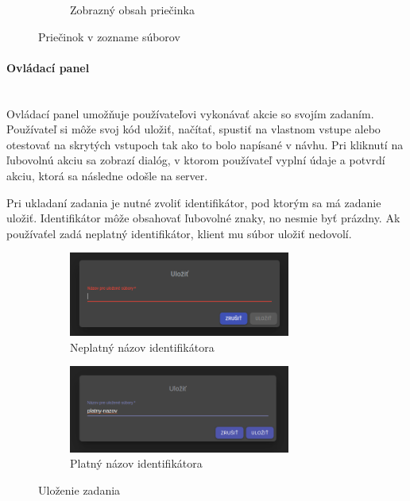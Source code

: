 \begin{figure}[H]
\begin{subfigure}{.5\textwidth}
  \caption[Zobrazný obsah priečinka]{Zobrazný obsah priečinka}
  \label{obr:zobrazeny_zoznam}
\end{subfigure}
\caption{Priečinok v zozname súborov}
\end{figure}

\paragraph{Ovládací panel}\leavevmode\\
Ovládací panel umožňuje používateľovi vykonávať akcie so svojím zadaním. Používateľ si môže svoj kód
uložiť, načítať, spustiť na vlastnom vstupe alebo otestovať na skrytých vstupoch tak ako to bolo 
napísané v návhu. Pri kliknutí na ľubovolnú akciu sa zobrazí dialóg, v ktorom používateľ vyplní
údaje a potvrdí akciu, ktorá sa následne odošle na server.

Pri ukladaní zadania je nutné zvoliť identifikátor, pod ktorým sa má zadanie uložiť. Identifikátor
môže obsahovať ľubovolné znaky, no nesmie byť prázdny. Ak používaťel zadá neplatný 
identifikátor, klient mu súbor uložiť nedovolí.
\begin{figure}[H]
\centering
\begin{subfigure}{.5\textwidth}
  \centering
  \includegraphics[width=0.8\textwidth]{images/neplatny_nazov}
  \caption[Neplatný názov identifikátora]{Neplatný názov identifikátora}
  \label{obr:neplatny_nazov}
\end{subfigure}%
\begin{subfigure}{.5\textwidth}
  \centering
  \includegraphics[width=0.8\textwidth]{images/platny_nazov}
  \caption[Platný názov identifikátora]{Platný názov identifikátora}
  \label{obr:platny_nazov}
\end{subfigure}
\caption{Uloženie zadania}
\end{figure}


